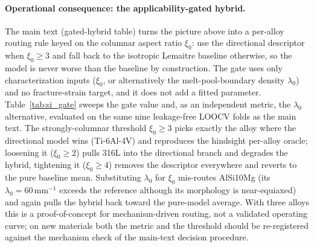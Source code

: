 \documentclass[11pt,a4paper,twocolumn]{article}
\begin{document}
\paragraph{Operational consequence: the applicability-gated hybrid.}
The main text (gated-hybrid table) turns the picture above into a per-alloy routing rule keyed on the columnar aspect ratio $\xi_0$: use the directional descriptor when $\xi_0\ge3$ and fall back to the isotropic Lemaitre baseline otherwise, so the model is never worse than the baseline by construction. The gate uses only characterization inputs ($\xi_0$, or alternatively the melt-pool-boundary density $\lambda_0$) and no fracture-strain target, and it does not add a fitted parameter. Table~\ref{tab:si_gate} sweeps the gate value and, as an independent metric, the $\lambda_0$ alternative, evaluated on the same nine leakage-free LOOCV folds as the main text. The strongly-columnar threshold $\xi_0\ge3$ picks exactly the alloy where the directional model wins (Ti-6Al-4V) and reproduces the hindsight per-alloy oracle; loosening it ($\xi_0\ge2$) pulls 316L into the directional branch and degrades the hybrid, tightening it ($\xi_0\ge4$) removes the descriptor everywhere and reverts to the pure baseline mean. Substituting $\lambda_0$ for $\xi_0$ mis-routes AlSi10Mg (its $\lambda_0=60\,\mathrm{mm}^{-1}$ exceeds the reference although its morphology is near-equiaxed) and again pulls the hybrid back toward the pure-model average. With three alloys this is a proof-of-concept for mechanism-driven routing, not a validated operating curve; on new materials both the metric and the threshold should be re-registered against the mechanism check of the main-text decision procedure.
\end{document}
